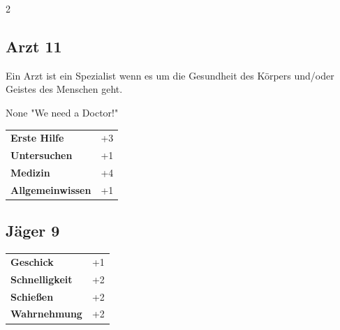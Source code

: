 \begin{multicols}{2}
\begin{tcolorbox}
\end{tcolorbox}

\begin{tcolorbox}
    \subsection*{Arzt \hfill \small{11 }}
    \tcblower
Ein Arzt ist ein Spezialist wenn es um die Gesundheit des Körpers und/oder Geistes des Menschen geht.

\begin{pquote}{None}
"We need a Doctor!"
\end{pquote}

\vspace{3mm}

\begin{tabular}{@{}ll@{}}
    \textbf{Erste Hilfe} & +3\\
    \textbf{Untersuchen} & +1\\
    \textbf{Medizin} & +4\\
    \textbf{Allgemeinwissen} & +1\\
\end{tabular}


\end{tcolorbox}

\begin{tcolorbox}
    \subsection*{Jäger \hfill \small{9 }}
    \tcblower




\begin{tabular}{@{}ll@{}}
    \textbf{Geschick} & +1\\
    \textbf{Schnelligkeit} & +2\\
    \textbf{Schießen} & +2\\
    \textbf{Wahrnehmung} & +2\\
\end{tabular}



\end{tcolorbox}
\end{multicols}
